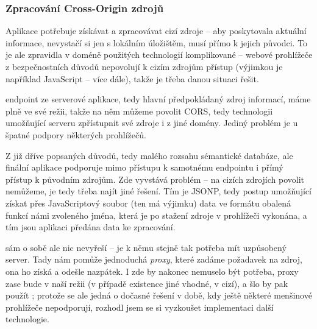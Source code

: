 
\subsubsection{Zpracování Cross-Origin zdrojů}
\label{sec:mobil:cross-origin}
Aplikace potřebuje získávat a zpracovávat cizí zdroje -- aby poskytovala aktuální informace, nevystačí si jen s lokálním úložištěm, musí přímo k jejich původci. To je ale zpravidla v doméně použitých technologií komplikované -- webové prohlížeče z bezpečnostních důvodů nepovolují k cizím zdrojům přístup (výjimkou je například JavaScript -- více dále), takže je třeba danou situaci řešit.

 endpoint ze serverové aplikace, tedy hlavní předpokládaný zdroj informací, máme plně ve své režii, takže na něm můžeme povolit \gls{CORS}, tedy technologii umožňující serveru zpřístupnit své zdroje i z jiné domény. Jediný problém je u špatné podpory některých prohlížečů.

Z již dříve popsaných důvodů, tedy malého rozsahu sémantické databáze, ale finální aplikace podporuje mimo přístupu k samotnému  endpointu i přímý přístup k původním zdrojům. Zde vyvstává problém -- na cizích zdrojích  povolit nemůžeme, je tedy třeba najít jiné řešení. Tím je \gls{JSONP}, tedy postup umožňující získat přes JavaScriptový soubor (ten má výjimku) data ve formátu  obalená funkcí námi zvoleného jména, která je po stažení zdroje v prohlížeči vykonána, a tím jsou aplikaci předána data ke zpracování.

 sám o sobě ale nic nevyřeší -- je k němu stejně tak potřeba mít uzpůsobený server. Tady nám pomůže jednoduchá \textit{proxy}, které zadáme požadavek na zdroj, ona ho získá a odešle nazpátek. I zde by nakonec nemuselo být    potřeba, proxy zase bude v naší režii (v případě existence jiné vhodné, v cizí), a šlo by pak použít ; protože se ale jedná o dočasné řešení v době, kdy ještě některé menšinové prohlížeče  nepodporují, rozhodl jsem se si vyzkoušet implementaci další technologie.

